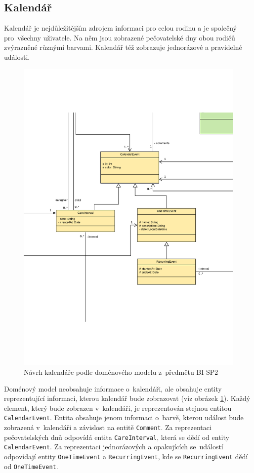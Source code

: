     \subsection{Kalendář}    
        Kalendář je nejdůležitějším zdrojem informaci pro celou rodinu a je společný pro~všechny uživatele. Na něm jsou zobrazené pečovatelské dny obou rodičů zvýrazněné různými barvami. Kalendář též zobrazuje jednorázové a pravidelné události.
        
        \begin{figure}\centering
	        \includegraphics[width=1.0\textwidth]{pdfs/CalendarInfo1}
	        \caption[Předešlý návrh kalendáře]{Návrh kalendáře podle doménového modelu z~předmětu BI-SP2}\label{image:calendar-info}
        \end{figure}
        Doménový model neobsahuje informace o~kalendáři, ale obsahuje entity reprezentující informaci, kterou kalendář bude zobrazovat (viz obrázek \ref{image:calendar-info}). Každý element, který bude zobrazen v~kalendáři, je reprezentován stejnou entitou \verb|CalendarEvent|. Entita obsahuje jenom informaci o~barvě, kterou událost bude zobrazená v~kalendáři a závislost na entitě \verb|Comment|. Za reprezentaci pečovatelských dnů odpovídá entita \verb|CareInterval|, která se dědí od entity \verb|CalendarEvent|. Za reprezentaci jednorázových a opakujících se~událostí odpovídají entity \verb|OneTimeEvent| a \verb|RecurringEvent|, kde se \verb|RecurringEvent| dědí od \verb|OneTimeEvent|.
        
